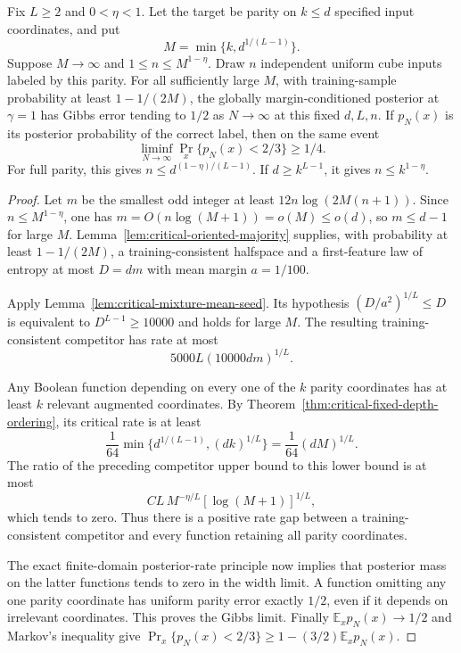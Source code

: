 

\begin{theorem}
\label{thm:critical-polynomial-sample-lower}
Fix $L\ge2$ and $0<\eta<1$. Let the target be parity on $k\le d$
specified input coordinates, and put
\[
 M=\min\{k,d^{1/(L-1)}\}.
\]
Suppose $M\to\infty$ and $1\le n\le M^{1-\eta}$. Draw $n$ independent
uniform cube inputs labeled by this parity. For all sufficiently large
$M$, with training-sample probability at least $1-1/(2M)$, the globally
margin-conditioned posterior at
$\gamma=1$ has Gibbs error tending to $1/2$ as $N\to\infty$ at
this fixed $d,L,n$. If $p_N(x)$ is its posterior probability of the
correct label, then on the same event
\[
 \liminf_{N\to\infty}\Pr_x\{p_N(x)<2/3\}\ge1/4.
\]
For full parity, this gives $n\le d^{(1-\eta)/(L-1)}$. If
$d\ge k^{L-1}$, it gives $n\le k^{1-\eta}$.
\end{theorem}

\begin{proof}
Let $m$ be the smallest odd integer at least
$12n\log(2M(n+1))$. Since $n\le M^{1-\eta}$, one has
$m=O(n\log(M+1))=o(M)\le o(d)$, so $m\le d-1$ for large $M$.
Lemma~\ref{lem:critical-oriented-majority} supplies, with probability at
least $1-1/(2M)$, a training-consistent halfspace and a first-feature
law of entropy at most $D=dm$ with mean margin $a=1/100$.

Apply Lemma~\ref{lem:critical-mixture-mean-seed}. Its hypothesis
$(D/a^2)^{1/L}\le D$ is equivalent to $D^{L-1}\ge10000$ and holds
for large $M$. The resulting training-consistent competitor has rate
at most
\[
 5000L(10000dm)^{1/L}.
\]

Any Boolean function depending on every one of the $k$ parity coordinates
has at least $k$ relevant augmented coordinates. By
Theorem~\ref{thm:critical-fixed-depth-ordering}, its critical rate is at least
\[
 \frac1{64}\min\{d^{1/(L-1)},(dk)^{1/L}\}
       =\frac1{64}(dM)^{1/L}.
\]
The ratio of the
preceding competitor upper bound to this lower bound is at most
\[
 C L\,M^{-\eta/L}[\log(M+1)]^{1/L},
\]
which tends to zero. Thus there is a positive rate gap between a
training-consistent competitor and every function retaining all
parity coordinates.

The exact finite-domain posterior-rate principle now implies that
posterior mass on the latter functions tends to zero in the width
limit. A function omitting any one parity coordinate has uniform
parity error exactly $1/2$, even if it depends on irrelevant coordinates.
This proves the Gibbs limit. Finally
$\mathbb E_xp_N(x)\to1/2$ and Markov's inequality give
$\Pr_x\{p_N(x)<2/3\}\ge1-(3/2)\mathbb E_xp_N(x)$.
\end{proof}

